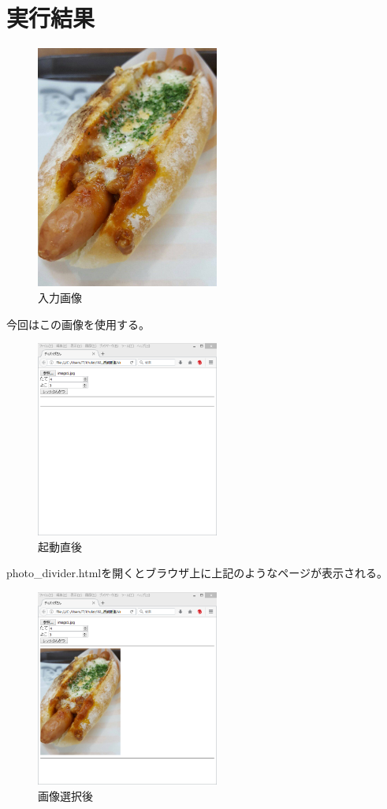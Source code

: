 \documentclass[a4j]{jsarticle}
\begin{document}
\section{実行結果}
\begin{figure}[H]
  \centering
  \includegraphics[width=6cm]{image1}
  \caption{入力画像}
\end{figure}
今回はこの画像を使用する。
\begin{figure}[H]
  \centering
  \includegraphics[width=6cm]{pr1}
  \caption{起動直後}
\end{figure}
photo\_divider.htmlを開くとブラウザ上に上記のようなページが表示される。
\begin{figure}[H]
  \centering
  \includegraphics[width=6cm]{pr2}
  \caption{画像選択後}
\end{figure}
\end{document}
